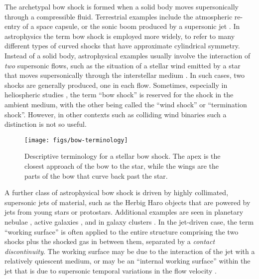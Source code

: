 \documentclass[useAMS, usenatbib, a4paper]{mnras}
\begin{document}
The archetypal bow shock is formed when a solid body moves
supersonically through a compressible fluid.  Terrestrial examples
include the atmospheric re-entry of a space capsule, or the sonic boom
produced by a supersonic jet \citep{van-Dyke:1982a}.  In astrophysics
the term bow shock is employed more widely, to refer to many different
types of curved shocks that have approximate cylindrical symmetry.
Instead of a solid body, astrophysical examples usually involve the
interaction of \emph{two} supersonic flows, such as the situation of a
stellar wind emitted by a star that moves supersonically through the
interstellar medium \citep{van-Buren:1988a, Kobulnicky:2010a,
  van-Marle:2011a, Mackey:2012b, Mackey:2015a}.  In such cases, two
shocks are generally produced, one in each flow.  Sometimes,
especially in heliospheric studies \citep{Zank:1999a, Scherer:2014a},
the term ``bow shock'' is reserved for the shock in the ambient
medium, with the other being called the ``wind shock'' or
``termination shock''.  However, in other contexts such as colliding
wind binaries \citep{Stevens:1992a, Gayley:2009a} such a distinction
is not so useful.  


\begin{figure}
  \centering
  \bigskip
  \texttt{[image: figs/bow-terminology]}
  \caption{Descriptive terminology for a stellar bow shock.  The apex
    is the closest approach of the bow to the star, while the wings
    are the parts of the bow that curve back past the star.}
  \label{fig:bow-terminology}
\end{figure}
A further class of astrophysical bow shock is driven by highly
collimated, supersonic jets of material, such as the Herbig Haro
objects \citep{Schwartz:1978b, Hartigan:1987a} that are powered by
jets from young stars or protostars.  Additional examples are seen in
planetary nebulae \citep{Phillips:2010a, Meaburn:2013a}, active
galaxies \citep{Wilson:1987a}, and in galaxy clusters
\citep{Markevitch:2002a}.  In the jet-driven case, the term ``working
surface'' is often applied to the entire structure comprising the two
shocks plus the shocked gas in between them, separated by a
\textit{contact discontinuity}.  The working surface may be due to the
interaction of the jet with a relatively quiescent medium, or may be an
``internal working surface'' within the jet that is due to
supersonic temporal variations in the flow velocity
\citep{Raga:1990a}.
\end{document}
